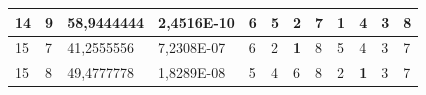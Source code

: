 \documentclass[conference]{IEEEtran}
\begin{document}
\begin{table}[]
\begin{tabular}{|llll|llllllll|}
\multicolumn{1}{|l|}{14}                                                    & \multicolumn{1}{l|}{9}                                                        & \multicolumn{1}{l|}{58,9444444}                                                   & 2,4516E-10                     & \multicolumn{1}{l|}{6}                                                  & \multicolumn{1}{l|}{5}                                                  & \multicolumn{1}{l|}{2}                                                  & \multicolumn{1}{l|}{7}                                                  & \multicolumn{1}{l|}{\textbf{1}}                                         & \multicolumn{1}{l|}{4}                                                  & \multicolumn{1}{l|}{3}                                                  & 8                          \\ \hline
\multicolumn{1}{|l|}{15}                                                    & \multicolumn{1}{l|}{7}                                                        & \multicolumn{1}{l|}{41,2555556}                                                   & 7,2308E-07                     & \multicolumn{1}{l|}{6}                                                  & \multicolumn{1}{l|}{2}                                                  & \multicolumn{1}{l|}{\textbf{1}}                                         & \multicolumn{1}{l|}{8}                                                  & \multicolumn{1}{l|}{5}                                                  & \multicolumn{1}{l|}{4}                                                  & \multicolumn{1}{l|}{3}                                                  & 7                          \\ \hline
\multicolumn{1}{|l|}{15}                                                    & \multicolumn{1}{l|}{8}                                                        & \multicolumn{1}{l|}{49,4777778}                                                   & 1,8289E-08                     & \multicolumn{1}{l|}{5}                                                  & \multicolumn{1}{l|}{4}                                                  & \multicolumn{1}{l|}{6}                                                  & \multicolumn{1}{l|}{8}                                                  & \multicolumn{1}{l|}{2}                                                  & \multicolumn{1}{l|}{\textbf{1}}                                         & \multicolumn{1}{l|}{3}                                                  & 7                          \\ \hline

\end{tabular}
\end{table}
\end{document}
